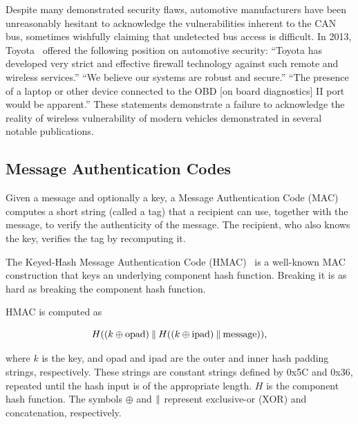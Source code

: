 Despite many demonstrated security flaws, automotive 
manufacturers have been unreasonably hesitant to acknowledge the vulnerabilities inherent to the CAN bus,
sometimes wishfully claiming that undetected bus access is difficult. 
In 2013, Toyota~\cite{bbc_toyota} offered the following position on automotive security: 
``Toyota has developed very strict and effective firewall technology against such remote and wireless services.'' 
``We believe our systems are robust and secure.'' 
``The presence of a laptop or other device connected to the OBD [on board diagnostics] II port would be apparent.'' 
These statements demonstrate a failure to acknowledge the 
reality of wireless vulnerability of modern vehicles demonstrated in several notable publications.

\subsection{Message Authentication Codes}

Given a message and optionally a key, a Message Authentication Code (MAC) computes a short string (called a tag) 
that a recipient can use, together with the message, to verify the authenticity of the message.  
The recipient, who also knows the key, 
verifies the tag by recomputing it.

The Keyed-Hash Message Authentication Code (HMAC)~\cite{HMAC,FIPS-198-1} 
is a well-known MAC construction that keys an underlying component hash function.  
Breaking it is as hard as breaking the component hash function.

HMAC is computed as

\begin{equation}
H((k\oplus \text{opad})\mathbin{\|} H((k\oplus \text{ipad})\mathbin{\|} \text{message})) ,
\end{equation}

\noindent
where $k$ is the key, and opad and ipad are the outer and inner hash padding strings, respectively. 
These strings are constant strings defined by 0x5C and 0x36, repeated until the hash input is of the appropriate length. 
$H$ is the component hash function. 
The symbols $\oplus$ and $\mathbin{\|}$ represent exclusive-or (XOR) and concatenation, respectively.




